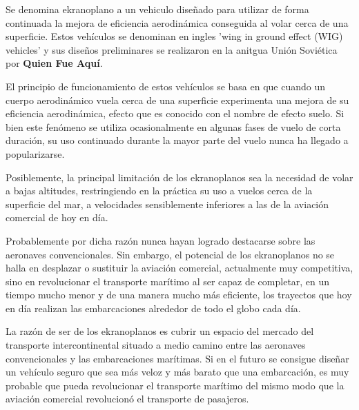 Se denomina ekranoplano a un vehiculo diseñado para utilizar de forma continuada la mejora de eficiencia aerodinámica conseguida al volar cerca de una superficie. Estos vehículos se denominan en ingles 'wing in ground effect (WIG) vehicles' y sus diseños preliminares se realizaron en la anitgua Unión Soviética por \textbf{Quien Fue Aquí}.


El principio de funcionamiento de estos vehículos se basa en que cuando un cuerpo aerodinámico vuela cerca de una superficie experimenta una mejora de su eficiencia aerodinámica, efecto que es conocido con el nombre de efecto suelo. Si bien este fenómeno se utiliza ocasionalmente en algunas fases de vuelo de corta duración, su uso continuado durante la mayor parte del vuelo nunca ha llegado a popularizarse.


Posiblemente, la principal limitación de los ekranoplanos sea la necesidad de volar a bajas altitudes, restringiendo en la práctica su uso a vuelos cerca de la superficie del mar, a velocidades sensiblemente inferiores a las de la aviación comercial de hoy en día.

Probablemente por dicha razón nunca hayan logrado destacarse sobre las aeronaves convencionales. Sin embargo, el potencial de los ekranoplanos no se halla en desplazar o sustituir la aviación comercial, actualmente muy competitiva, sino en revolucionar el transporte marítimo al ser capaz de completar, en un tiempo mucho menor y de una manera mucho más eficiente, los trayectos que hoy en día realizan las embarcaciones alrededor de todo el globo cada día.


La razón de ser de los ekranoplanos es cubrir un espacio del mercado del transporte intercontinental situado a medio camino entre las aeronaves convencionales y las embarcaciones marítimas. Si en el futuro se consigue diseñar un vehículo seguro que sea más veloz y más barato que una embarcación, es muy probable que pueda revolucionar el transporte marítimo del mismo modo que la aviación comercial revolucionó el transporte de pasajeros.

